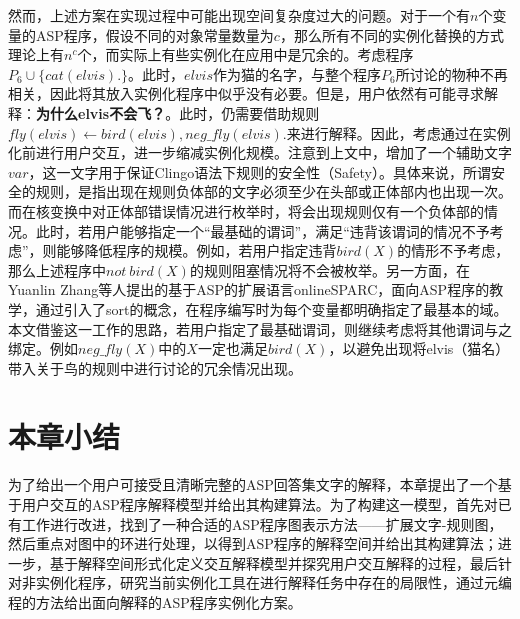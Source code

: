     然而，上述方案在实现过程中可能出现空间复杂度过大的问题。对于一个有$n$个变量的ASP程序，假设不同的对象常量数量为$c$，那么所有不同的实例化替换的方式理论上有$n^c$个，而实际上有些实例化在应用中是冗余的。考虑程序$P_6 \cup \{cat(elvis).\}$。此时，$elvis$作为猫的名字，与整个程序$P_6$所讨论的物种不再相关，因此将其放入实例化程序中似乎没有必要。但是，用户依然有可能寻求解释：\textbf{为什么elvis不会飞？}。此时，仍需要借助规则$fly(elvis) \leftarrow bird(elvis), neg\_fly(elvis).$来进行解释。因此，考虑通过在实例化前进行用户交互，进一步缩减实例化规模。注意到上文中，增加了一个辅助文字$var$，这一文字用于保证Clingo语法下规则的安全性（Safety）。具体来说，所谓安全的规则，是指出现在规则负体部的文字必须至少在头部或正体部内也出现一次\cite{calimeri2020aspcore2}。而在核变换中对正体部错误情况进行枚举时，将会出现规则仅有一个负体部的情况。此时，若用户能够指定一个“最基础的谓词”，满足“违背该谓词的情况不予考虑”，则能够降低程序的规模。例如，若用户指定违背$bird(X)$的情形不予考虑，那么上述程序中$not\ bird(X)$的规则阻塞情况将不会被枚举。另一方面，在Yuanlin Zhang等人提出的基于ASP的扩展语言\textsf{onlineSPARC}，面向ASP程序的教学，通过引入了sort的概念，在程序编写时为每个变量都明确指定了最基本的域\cite{marcopoulos2019onlinesparc, balai2013answer}。本文借鉴这一工作的思路，若用户指定了最基础谓词，则继续考虑将其他谓词与之绑定。例如$neg\_fly(X)$中的$X$一定也满足$bird(X)$，以避免出现将elvis（猫名）带入关于鸟的规则中进行讨论的冗余情况出现。


    \section{本章小结}
    为了给出一个用户可接受且清晰完整的ASP回答集文字的解释，本章提出了一个基于用户交互的ASP程序解释模型并给出其构建算法。为了构建这一模型，首先对已有工作进行改进，找到了一种合适的ASP程序图表示方法——扩展文字-规则图，然后重点对图中的环进行处理，以得到ASP程序的解释空间并给出其构建算法；进一步，基于解释空间形式化定义交互解释模型并探究用户交互解释的过程，最后针对非实例化程序，研究当前实例化工具在进行解释任务中存在的局限性，通过元编程的方法给出面向解释的ASP程序实例化方案。